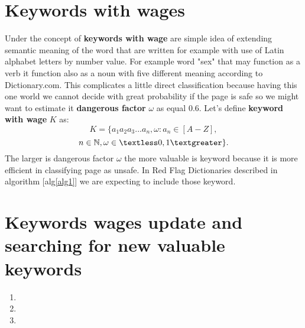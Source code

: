 \documentclass[9pt,a4paper]{extarticle}
\begin{document}
\begin{multicols}{2}
\section{Keywords with wages}
Under the concept of \textbf{keywords with wage} are simple idea of extending semantic meaning of the word that are written for example with use of Latin alphabet letters by number value. For example word "sex" that may function as a verb it function also as a noun with five different meaning according to Dictionary.com\cite{noauthor_dictionary.com_2018}. This complicates a little direct classification because having this one world we cannot decide with great probability if the page is safe so we might want to estimate it \textbf{dangerous factor} \(\omega\) as equal 0.6. Let's define \textbf{keyword with wage} \(K\) as:
$$
K = \{a_1a_2a_3...a_n, \omega : a_n \in [A-Z], 
$$
$$
n \in \mathbb{N}, \omega \in \textless0,1\textgreater\}.
$$
The larger is dangerous factor \(\omega\) the more valuable is keyword because it is more efficient in classifying page as unsafe. In Red Flag Dictionaries described in algorithm [alg\ref{alg1}] we are expecting to include those keyword. 

\section{Keywords wages update and searching for new valuable keywords}

\begin{enumerate}
\item 
\item 
\item 
\end{enumerate}


\end{multicols}
\end{document}
